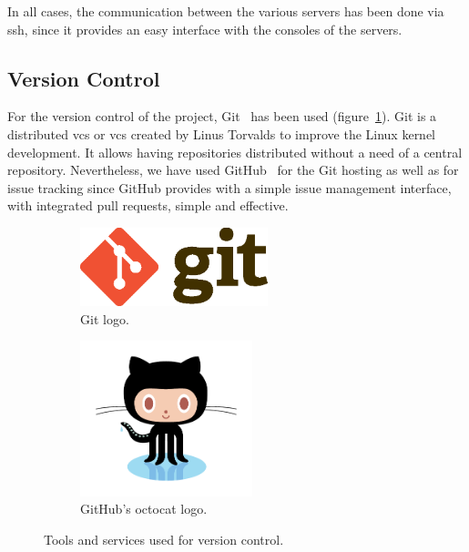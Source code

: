 In all cases, the communication between the various servers has been done via \acrshort{ssh}, since
it provides an easy interface with the consoles of the servers.

\subsection{Version Control}

For the version control of the project, Git~\cite{git_web} has been used (figure~\ref{subfig:git}).
Git is a distributed \acrlong{vcs} or \acrshort{vcs} created by Linus Torvalds to improve the Linux
kernel development. It allows having repositories distributed without a need of a central
repository. Nevertheless, we have used GitHub~\cite{github_web} for the Git hosting as well as for
issue tracking since GitHub provides with a simple issue management interface, with integrated pull
requests, simple and effective.

\begin{figure}[!htbp]
	\centering
	\begin{subfigure}{0.6\textwidth}
		\centering
		\includegraphics[width=0.6\textwidth]{fig/git.eps}
		\caption{Git logo.}\label{subfig:git}
	\end{subfigure}\quad
	\begin{subfigure}{0.3\textwidth}
		\centering
		\includegraphics[width=0.55\textwidth]{fig/github}
		\caption{GitHub's octocat logo.}\label{subfig:github}
	\end{subfigure}\quad
	\caption{Tools and services used for version control.}
\end{figure}
